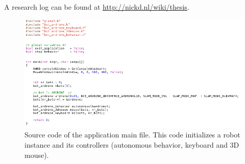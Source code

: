 A research log can be found at \url{http://nickd.nl/wiki/thesis}.

\begin{figure}[htb]
\centering
\includegraphics[width=\linewidth]{images/screenshot-code.png}
\caption{Source code of the application main file. This code initializes a robot instance and its controllers (autonomous behavior, keyboard and 3D mouse).}
\end{figure}
